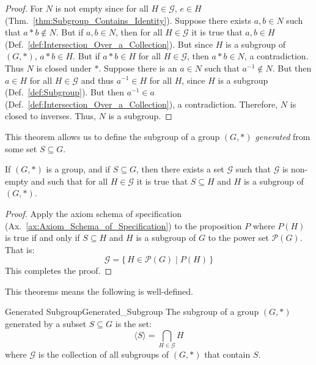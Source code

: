         \begin{proof}
            For $N$ is not empty since for all $H\in\mathcal{G}$, $e\in{H}$
            (Thm.~\ref{thm:Subgroup_Contains_Identity}). Suppose there exists
            $a,b\in{N}$ such that $a*b\notin{N}$. But if $a,b\in{N}$, then for
            all $H\in\mathcal{G}$ it is true that $a,b\in{H}$
            (Def.~\ref{def:Intersection_Over_a_Collection}). But since $H$ is a
            subgroup of $(G,*)$, $a*b\in{H}$. But if $a*b\in{H}$ for all
            $H\in\mathcal{G}$, then $a*b\in{N}$, a contradiction. Thus $N$ is
            closed under $*$. Suppose there is an $a\in{N}$ such that
            $a^{\minus{1}}\notin{N}$. But then $a\in{H}$ for all
            $H\in\mathcal{G}$ and thus $a^{\minus{1}}\in{H}$ for all $H$, since
            $H$ is a subgroup (Def.~\ref{def:Subgroup}). But then
            $a^{\minus{1}}\in{a}$
            (Def.~\ref{def:Intersection_Over_a_Collection}), a contradiction.
            Therefore, $N$ is closed to inverses. Thus, $N$ is a subgroup.
        \end{proof}
        This theorem allows us to define the subgroup of a group $(G,*)$
        \textit{generated} from some set $S\subseteq{G}$.
        \begin{theorem}
            If $(G,*)$ is a group, and if $S\subseteq{G}$, then there exists a
            set $\mathcal{G}$ such that $\mathcal{G}$ is non-empty and such that
            for all $H\in\mathcal{G}$ it is true that $S\subseteq{H}$ and $H$ is
            a subgroup of $(G,*)$.
        \end{theorem}
        \begin{proof}
            Apply the axiom schema of specification
            (Ax.~\ref{ax:Axiom_Schema_of_Specification}) to the proposition
            $P$ where $P(H)$ is true if and only if $S\subseteq{H}$ and $H$ is
            a subgroup of $G$ to the power set $\mathcal{P}(G)$. That is:
            \begin{equation}
                \mathcal{G}=\big\{\,H\in\mathcal{P}(G)\;|\;P(H)\,\big\}
            \end{equation}
            This completes the proof.
        \end{proof}
        This theorems means the following is well-defined.
        \begin{fdefinition}{Generated Subgroup}{Generated_Subgroup}
            The subgroup of a group $(G,*)$ generated by a subset
            $S\subseteq{G}$ is the set:
            \begin{equation*}
                \langle{S}\rangle=\bigcap_{H\in\mathcal{G}}H
            \end{equation*}
            where $\mathcal{G}$ is the collection of all subgroups of $(G,*)$
            that contain $S$.
        \end{fdefinition}
